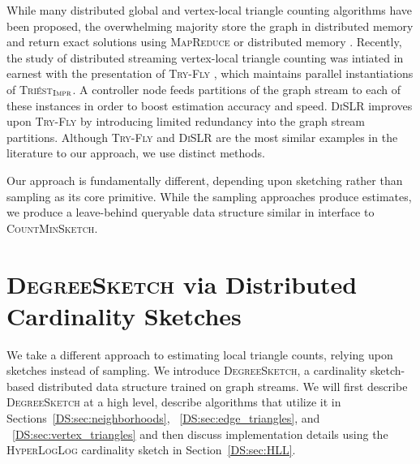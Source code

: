 \documentclass[10]{article}
\newcommand{\algoname}[1]{\textnormal{\textsc{#1}}}
\begin{document}
While many distributed global and vertex-local triangle counting algorithms have been proposed, the overwhelming majority store the graph in distributed memory and return exact solutions using \algoname{MapReduce} \cite{suri2011counting} or distributed memory \cite{arifuzzaman2013patric, pearce2017triangle}.
Recently, the study of distributed streaming vertex-local triangle counting was intiated in earnest with the presentation of \algoname{Try-Fly} \cite{shin2018tri}, which maintains parallel instantiations of \algoname{Tri\'est$_{\algoname{Impr}}$}.
A controller node feeds partitions of the graph stream to each of these instances in order to boost estimation accuracy and speed.
\algoname{DiSLR} \cite{shin2018dislr} improves upon \algoname{Try-Fly} by introducing limited redundancy into the graph stream partitions.
Although \algoname{Try-Fly} and \algoname{DiSLR} are the most similar examples in the literature to our approach, we use distinct methods.

Our approach is fundamentally different, depending upon sketching rather than sampling as its core primitive. 
While the sampling approaches produce estimates, we produce a leave-behind queryable data structure similar in interface to \algoname{CountMinSketch}.


\section{\algoname{DegreeSketch} via Distributed Cardinality Sketches}
 \label{DS:sec:DS}

We take a different approach to estimating local triangle counts, relying upon sketches instead of sampling.
We introduce \algoname{DegreeSketch}, a cardinality sketch-based distributed data structure trained on graph streams.
We will first describe \algoname{DegreeSketch} at a high level, describe algorithms that utilize it in Sections~\ref{DS:sec:neighborhoods}, ~\ref{DS:sec:edge_triangles}, and ~\ref{DS:sec:vertex_triangles} and then discuss implementation details using the \algoname{HyperLogLog} cardinality sketch in Section~\ref{DS:sec:HLL}.
\end{document}
